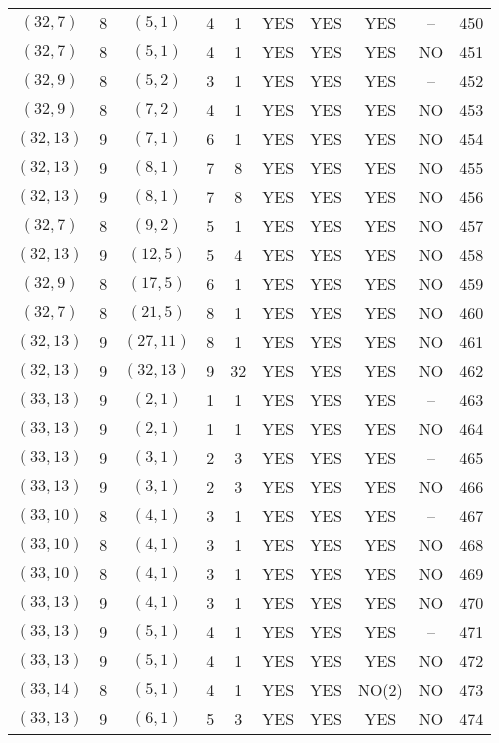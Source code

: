 \begin{longtable}{|c|c|c|c|c|c|c|c|c|c|}
$(32, 7)$ & 8 & $(5, 1)$ & 4 & 1 & YES & YES & YES & -- & 450\\
$(32, 7)$ & 8 & $(5, 1)$ & 4 & 1 & YES & YES & YES & NO & 451\\
$(32, 9)$ & 8 & $(5, 2)$ & 3 & 1 & YES & YES & YES & -- & 452\\
$(32, 9)$ & 8 & $(7, 2)$ & 4 & 1 & YES & YES & YES & NO & 453\\
$(32, 13)$ & 9 & $(7, 1)$ & 6 & 1 & YES & YES & YES & NO & 454\\
$(32, 13)$ & 9 & $(8, 1)$ & 7 & 8 & YES & YES & YES & NO & 455\\
$(32, 13)$ & 9 & $(8, 1)$ & 7 & 8 & YES & YES & YES & NO & 456\\
$(32, 7)$ & 8 & $(9, 2)$ & 5 & 1 & YES & YES & YES & NO & 457\\
$(32, 13)$ & 9 & $(12, 5)$ & 5 & 4 & YES & YES & YES & NO & 458\\
$(32, 9)$ & 8 & $(17, 5)$ & 6 & 1 & YES & YES & YES & NO & 459\\
$(32, 7)$ & 8 & $(21, 5)$ & 8 & 1 & YES & YES & YES & NO & 460\\
$(32, 13)$ & 9 & $(27, 11)$ & 8 & 1 & YES & YES & YES & NO & 461\\
$(32, 13)$ & 9 & $(32, 13)$ & 9 & 32 & YES & YES & YES & NO & 462\\
$(33, 13)$ & 9 & $(2, 1)$ & 1 & 1 & YES & YES & YES & -- & 463\\
$(33, 13)$ & 9 & $(2, 1)$ & 1 & 1 & YES & YES & YES & NO & 464\\
$(33, 13)$ & 9 & $(3, 1)$ & 2 & 3 & YES & YES & YES & -- & 465\\
$(33, 13)$ & 9 & $(3, 1)$ & 2 & 3 & YES & YES & YES & NO & 466\\
$(33, 10)$ & 8 & $(4, 1)$ & 3 & 1 & YES & YES & YES & -- & 467\\
$(33, 10)$ & 8 & $(4, 1)$ & 3 & 1 & YES & YES & YES & NO & 468\\
$(33, 10)$ & 8 & $(4, 1)$ & 3 & 1 & YES & YES & YES & NO & 469\\
$(33, 13)$ & 9 & $(4, 1)$ & 3 & 1 & YES & YES & YES & NO & 470\\
$(33, 13)$ & 9 & $(5, 1)$ & 4 & 1 & YES & YES & YES & -- & 471\\
$(33, 13)$ & 9 & $(5, 1)$ & 4 & 1 & YES & YES & YES & NO & 472\\
$(33, 14)$ & 8 & $(5, 1)$ & 4 & 1 & YES & YES & NO(2) & NO & 473\\
$(33, 13)$ & 9 & $(6, 1)$ & 5 & 3 & YES & YES & YES & NO & 474\\

\end{longtable}
